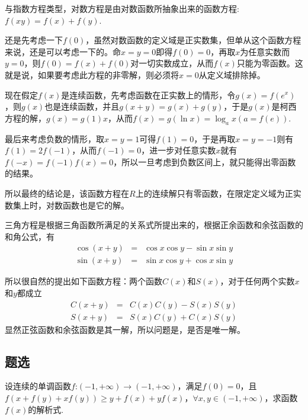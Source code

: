 与指数方程类型，对数方程是由对数函数所抽象出来的函数方程: $f(xy)=f(x)+f(y)$.

还是先考虑一下$f(0)$，虽然对数函数的定义域是正实数集，但单从这个函数方程来说，还是可以考虑一下的。命$x=y=0$即得$f(0)=0$，再取$x$为任意实数而$y=0$，则$f(0)=f(x)+f(0)$对一切实数成立，从而$f(x)$只能为零函数。这就是说，如果要考虑此方程的非零解，则必须将$x=0$从定义域排除掉。

现在假定$f(x)$是连续函数，先考虑函数在正实数上的情形，令$g(x)=f(e^x)$，则$g(x)$也是连续函数，并且$g(x+y)=g(x)+g(y)$，于是$g(x)$是柯西方程的解，$g(x)=g(1)x$，从而$f(x)=g(\ln{x})=\log_a{x}(a=f(e))$.

最后来考虑负数的情形，取$x=y=1$可得$f(1)=0$，于是再取$x=y=-1$则有$f(1)=2f(-1)$，从而$f(-1)=0$，进一步对任意实数$x$就有$f(-x)=f(-1)f(x)=0$，所以一旦考虑到负数区间上，就只能得出零函数的结果。

所以最终的结论是，该函数方程在$R$上的连续解只有零函数，在限定定义域为正实数集上时，对数函数也是它的解。

三角方程是根据三角函数所满足的关系式所提出来的，根据正余函数和余弦函数的和角公式，有
\begin{eqnarray*}
  \cos{(x+y)} & = & \cos{x}\cos{y} - \sin{x}\sin{y} \\
  \sin{(x+y)} & = & \sin{x}\cos{y} + \cos{x}\sin{y}
\end{eqnarray*}

所以很自然的提出如下函数方程：两个函数$C(x)$和$S(x)$，对于任何两个实数$x$和$y$都成立
\begin{eqnarray*}
  C{(x+y)} & = & C(x)C(y) - S(x)S(y) \\
  S{(x+y)} & = & S(x)C(y) + C(x)S(y)
\end{eqnarray*}
显然正弦函数和余弦函数是其一解，所以问题是，是否是唯一解。


\subsection{题选}
\label{sec:exercise-for-function-equation}

\begin{exercise}
  设连续的单调函数$f$:$(-1,+\infty) \to (-1,+\infty)$，满足$f(0)=0$，且$f(x+f(y)+xf(y)) \geqslant y+f(x)+yf(x)$，$\forall x,y \in (-1,+\infty)$，求函数$f(x)$的解析式.
\end{exercise}

\exerciseFrom[\url{http://kuing.orzweb.net/viewthread.php?tid=4817}]

\exerciseSolvedDate[2017-09-06]

